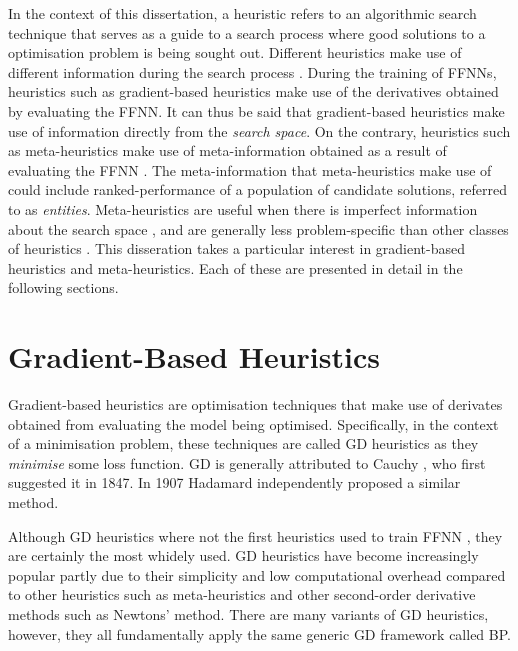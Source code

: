 In the context of this dissertation, a heuristic refers to an algorithmic search technique that serves as a guide to a search process where good solutions to a optimisation problem is being sought out. Different heuristics make use of different information during the search process \cite{ref:kheiri:2017}. During the training of \acp{FFNN}, heuristics such as gradient-based heuristics make use of the derivatives obtained by evaluating the \ac{FFNN}. It can thus be said that gradient-based heuristics make use of information directly from the \textit{search space}. On the contrary, heuristics such as meta-heuristics make use of meta-information obtained as a result of evaluating the \ac{FFNN} \cite{ref:blum:2003}. The meta-information that meta-heuristics make use of could include ranked-performance of a population of candidate solutions, referred to as \textit{entities}. Meta-heuristics are useful when there is imperfect information about the search space \cite{ref:bianchi:2009}, and are generally less problem-specific than other classes of heuristics \cite{ref:blum:2003}. This disseration takes a particular interest in gradient-based heuristics and meta-heuristics. Each of these are presented in detail in the following sections.


\section{Gradient-Based Heuristics}\label{sec:heuristics:gd}

Gradient-based heuristics are optimisation techniques that make use of derivates obtained from evaluating the model being optimised. Specifically, in the context of a minimisation problem, these techniques are called \acf{GD} heuristics as they \textit{minimise} some loss function. \Acs{GD} is generally attributed to Cauchy \cite{ref:lemarechal:2012}, who first suggested it in 1847. In 1907 Hadamard \cite{ref:hadamard:1908} independently proposed a similar method.

Although \acs{GD} heuristics where not the first heuristics used to train \ac{FFNN}
\cite{ref:engelbrecht:2007}, they are certainly the most whidely used. \Acs{GD} heuristics have become increasingly popular partly due to their simplicity and low computational overhead compared to other heuristics such as meta-heuristics and other second-order derivative methods such as Newtons' method. There are many variants of \acs{GD} heuristics, however, they all fundamentally apply the same generic \acs{GD} framework called \acl{BP}.


